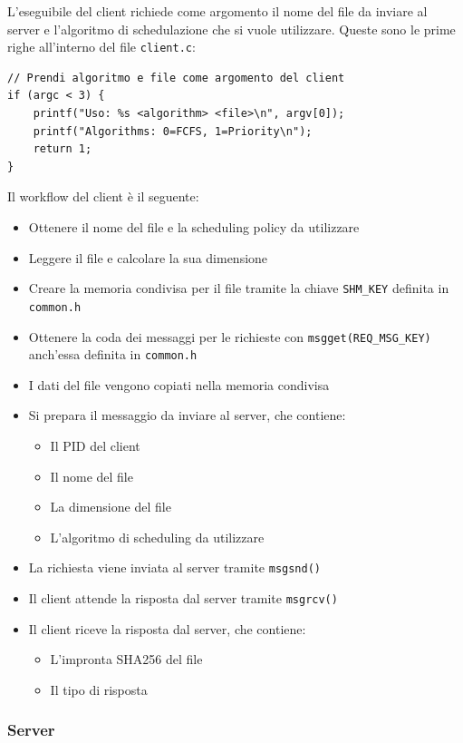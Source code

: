\documentclass[a4paper]{article}
\begin{document}
L'eseguibile del client richiede come argomento il nome del file da inviare al server e l'algoritmo 
di schedulazione che si vuole utilizzare. Queste sono le prime righe all'interno del file \texttt{client.c}:
\begin{verbatim}
// Prendi algoritmo e file come argomento del client
if (argc < 3) {
    printf("Uso: %s <algorithm> <file>\n", argv[0]);
    printf("Algorithms: 0=FCFS, 1=Priority\n");
    return 1;
}
\end{verbatim}
\noindent
Il workflow del client è il seguente:
\begin{itemize}
    \item Ottenere il nome del file e la scheduling policy da utilizzare
    \item Leggere il file e calcolare la sua dimensione
    \item Creare la memoria condivisa per il file tramite la chiave
    \texttt{SHM\_KEY} definita in \texttt{common.h}
    \item Ottenere la coda dei messaggi per le richieste con \texttt{msgget(REQ\_MSG\_KEY)}
    anch'essa definita in \texttt{common.h}
    \item I dati del file vengono copiati nella memoria condivisa
    \item Si prepara il messaggio da inviare al server, che contiene:
    \begin{itemize}
        \item Il PID del client
        \item Il nome del file
        \item La dimensione del file
        \item L'algoritmo di scheduling da utilizzare
    \end{itemize}
    \item La richiesta viene inviata al server tramite \texttt{msgsnd()}
    \item Il client attende la risposta dal server tramite \texttt{msgrcv()}
    \item Il client riceve la risposta dal server, che contiene:
    \begin{itemize}
        \item L'impronta SHA256 del file
        \item Il tipo di risposta
    \end{itemize}
\end{itemize}

\subsubsection{Server}
\end{document}
